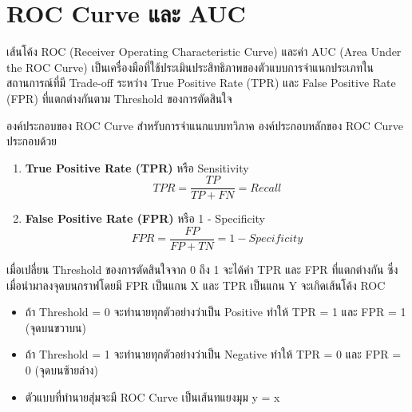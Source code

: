 \section{ROC Curve และ AUC}
เส้นโค้ง ROC (Receiver Operating Characteristic Curve) และค่า AUC (Area Under the ROC Curve) เป็นเครื่องมือที่ใช้ประเมินประสิทธิภาพของตัวแบบการจำแนกประเภทในสถานการณ์ที่มี Trade-off ระหว่าง True Positive Rate (TPR) และ False Positive Rate (FPR) ที่แตกต่างกันตาม Threshold ของการตัดสินใจ

\begin{myBox}[]{องค์ประกอบของ ROC Curve}{}
สำหรับการจำแนกแบบทวิภาค องค์ประกอบหลักของ ROC Curve ประกอบด้วย

\begin{enumerate}
\item \textbf{True Positive Rate (TPR)} หรือ Sensitivity
$$TPR = \frac{TP}{TP + FN} = Recall$$

\item \textbf{False Positive Rate (FPR)} หรือ 1 - Specificity
$$FPR = \frac{FP}{FP + TN} = 1 - Specificity$$
\end{enumerate}

เมื่อเปลี่ยน Threshold ของการตัดสินใจจาก 0 ถึง 1 จะได้ค่า TPR และ FPR ที่แตกต่างกัน ซึ่งเมื่อนำมาลงจุดบนกราฟโดยมี FPR เป็นแกน X และ TPR เป็นแกน Y จะเกิดเส้นโค้ง ROC

\begin{itemize}
\item ถ้า Threshold = 0 จะทำนายทุกตัวอย่างว่าเป็น Positive ทำให้ TPR = 1 และ FPR = 1 (จุดบนขวาบน)
\item ถ้า Threshold = 1 จะทำนายทุกตัวอย่างว่าเป็น Negative ทำให้ TPR = 0 และ FPR = 0 (จุดบนซ้ายล่าง)
\item ตัวแบบที่ทำนายสุ่มจะมี ROC Curve เป็นเส้นทแยงมุม y = x
\end{itemize}
\end{myBox}

